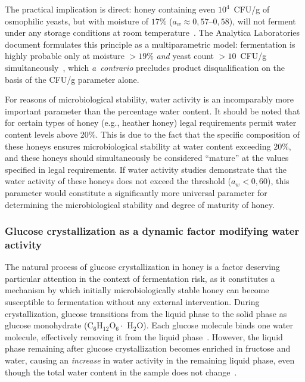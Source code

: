The practical implication is direct: honey containing even
$10^4$~CFU/g of osmophilic yeasts, but with moisture of $17\%$
($a_w \approx 0{,}57$--$0{,}58$), will not ferment under any
storage conditions at room temperature~\cite{alwaili2012}.
The Analytica Laboratories document formulates this principle
as a multiparametric model: fermentation is highly probable only
at moisture $> 19\%$ \emph{and} yeast count $> 10$~CFU/g
simultaneously~\cite{analytica2020}, which \textit{a~contrario}
precludes product disqualification on the basis of the CFU/g
parameter alone.

For reasons of microbiological stability, water activity is an
incomparably more important parameter than the percentage water
content. It should be noted that for certain types of honey
(e.g., heather honey) legal requirements permit water content
levels above 20\%. This is due to the fact that the specific
composition of these honeys ensures microbiological stability at
water content exceeding 20\%, and these honeys should simultaneously
be considered ``mature'' at the values specified in legal
requirements. If water activity studies demonstrate that the water
activity of these honeys does not exceed the threshold
($a_w < 0{,}60$), this parameter would constitute a significantly
more universal parameter for determining the microbiological
stability and degree of maturity of honey.

\subsubsection{Glucose crystallization as a dynamic factor modifying water activity}

The natural process of glucose crystallization in honey is a factor
deserving particular attention in the context of fermentation risk,
as it constitutes a mechanism by which initially microbiologically
stable honey can become susceptible to fermentation without any
external intervention. During crystallization, glucose transitions
from the liquid phase to the solid phase as glucose monohydrate
(C$_6$H$_{12}$O$_6 \cdot$ H$_2$O). Each glucose molecule binds
one water molecule, effectively removing it from the liquid
phase~\cite{zamora2006}. However, the liquid phase remaining
after glucose crystallization becomes enriched in fructose and
water, causing an \emph{increase} in water activity in the
remaining liquid phase, even though the total water content in
the sample does not change~\cite{zamora2006,ijfans2019}.

